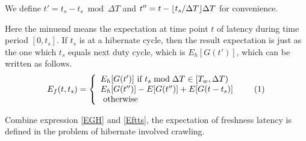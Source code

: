 \documentclass[conference]{IEEEtran}
\newcommand\numberthis{\addtocounter{equation}{1}\tag{\theequation}}
\DeclarePairedDelimiter\floor{\lfloor}{\rfloor}
\begin{document}
We define $t'=t_s-t_s\bmod\Delta T$ and $t''=t-\floor{t_s/\Delta T}\Delta T$ for convenience.

Here the minuend means the expectation at time point $t$ of latency during time period $[0, t_s]$.
If $t_s$ is at a hibernate cycle, then the result expectation is just as the one which $t_s$ equals next duty cycle, which is $E_h[G(t')]$, which can be written as follows.
\[E_f(t,t_s)=\left\{
    \begin{array}{lr}
    E_h[G(t')]\text{ if } t_s\bmod\Delta T\in [T_w, \Delta T)\\
    E_h[G(t'')]-E[G(t'')]+E[G(t-t_s)]\\
    \text{ otherwise }
    \end{array}\numberthis \label{Eftts}
    \right.
\]


Combine expression \eqref{EGH} and \eqref{Eftts}, the expectation of freshness latency is defined in the problem of hibernate involved crawling.
\end{document}
